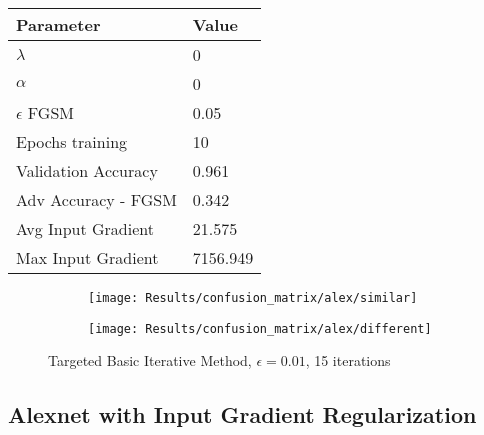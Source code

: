 \documentclass[draft,final]{vutinfth} %
\begin{document}
\begin{table}[h]
  \centering
  \begin{tabular}{ll}
    \toprule
			Parameter			& Value   \\
    \midrule
			$\lambda$								& 0				\\
			$\alpha$								& 0				\\
			$\epsilon$ FGSM					& 0.05		\\
			Epochs training					& 10			\\
			
			Validation Accuracy			& 0.961		\\
			Adv Accuracy - FGSM			& 0.342		\\
			
			Avg Input Gradient			& 21.575	\\
			Max Input Gradient			& 7156.949\\
    \bottomrule
  \end{tabular}
\end{table}


\begin{figure}[h]
  \begin{subfigure}[b]{0.5\columnwidth}
		\centering
    \texttt{[image: Results/confusion\_matrix/alex/similar]}%
    \label{fig:exp:cm:alex:similar}
  \end{subfigure}
  \begin{subfigure}[b]{0.5\columnwidth}
		\centering
    \texttt{[image: Results/confusion\_matrix/alex/different]}
    \label{fig:exp:cm:alex:different}
  \end{subfigure}
  \caption{Targeted Basic Iterative Method, $\epsilon = 0.01$, 15 iterations}
	\label{fig:exp:cm:alex}
\end{figure}
\clearpage

\subsection{Alexnet with Input Gradient Regularization}
\end{document}
